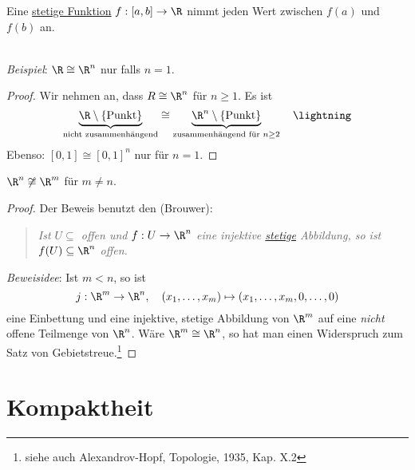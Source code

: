 \begin{corollary}[Zwischenwertsatz]
  Eine \hyperref[def:stetig]{stetige Funktion} \( f: [a,b] \to \R \) nimmt jeden Wert zwischen \( f(a) \) und \( f(b) \) an.
\end{corollary}

\begin{remark}
  \  \\ \emph{Beispiel}: \( \R \cong \R^n \) nur falls \( n = 1 \).
  \begin{proof}
    Wir nehmen an, dass \( R \cong \R^n \) für \( n \geq 1 \). Es ist
    \begin{equation*}
      \underbrace{\R \setminus \{ \text{Punkt} \}}_{\text{nicht zusammenhängend}} \cong \underbrace{\R^n \setminus \{ \text{Punkt} \} }_{\text{zusammenhängend für } n \geq 2} \quad \lightning
    \end{equation*}
    Ebenso: \( [0,1] \cong {[0,1]}^n \) nur für \( n = 1 \).
  \end{proof}
\end{remark}

\begin{theorem}
  \( \R^n \not \cong \R^m \) für \( m \neq n \).
  \begin{proof}
    Der Beweis benutzt den \label{th:satzGebietstreue} (Brouwer):
    \begin{quote}
      \emph{Ist \( U \subseteq \) offen und \( f: U \to \R^n \) eine injektive \hyperref[def:stetig]{stetige} Abbildung, so ist \( f(U) \subseteq \R^n \) offen.}
    \end{quote}
    \emph{Beweisidee}: Ist \( m < n \), so ist
    \begin{equation*}
      j: \R^m \to \R^n, \quad (x_1, \dots, x_m) \mapsto (x_1, \dots, x_m, 0, \dots, 0)
    \end{equation*}
    eine Einbettung und eine injektive, stetige Abbildung von \( \R^m \) auf eine \emph{nicht} offene Teilmenge von \( \R^n \). Wäre \( \R^m \cong \R^n \), so hat man einen Widerspruch zum Satz von Gebietstreue.\footnote{siehe auch Alexandrov-Hopf, Topologie, 1935, Kap. X.2}
  \end{proof}
\end{theorem}

\section{Kompaktheit}

